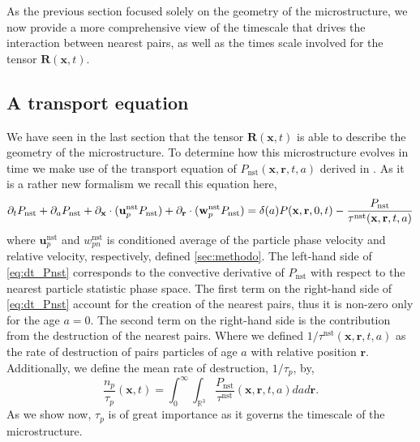 As the previous section focused solely on the geometry of the microstructure, we now provide a more comprehensive view of the timescale that drives the interaction between nearest pairs, as well as the times scale involved for the tensor $\textbf{R}(\textbf{x},t)$.

\subsection{A transport equation}
We have seen in the last section that the tensor $\textbf{R}(\textbf{x},t)$ is able to describe the geometry of the microstructure. 
To determine how this microstructure evolves in time we make use of the transport equation of $P_\text{nst}(\textbf{x},\textbf{r},t,a)$ derived in \citet{zhang2023evolution}.
As it is a rather new formalism we recall this equation here, 
\begin{equation}
    \partial_t P_\text{nst}
    + \partial_a P_\text{nst}
    + \partial_\textbf{x} \cdot  (\textbf{u}^\text{nst}_p P_\text{nst})
    + \partial_\textbf{r} \cdot  (\textbf{w}^\text{nst}_p P_\text{nst})
    = \delta(a)P(\textbf{x},\textbf{r},0,t)
    - \frac{P_\text{nst}}{\tau^\text{nst}(\textbf{x},\textbf{r},t,a)}
    \label{eq:dt_Pnst}
\end{equation}
where $\textbf{u}^\text{nst}_p$ and $w_{pn}^\text{nst}$ is conditioned average of the particle phase velocity and relative velocity, respectively, defined \ref{sec:methodo}. 
The left-hand side of \ref{eq:dt_Pnst} corresponds to the convective derivative of $P_\text{nst}$ with respect to the nearest particle statistic phase space. 
The first term on the right-hand side of \ref{eq:dt_Pnst} account for the creation of the nearest pairs, thus it is non-zero only for the age $a = 0$. 
The second term on the right-hand side is the contribution from the destruction of the nearest pairs.
Where we defined $1/\tau^\text{nst}(\textbf{x},\textbf{r},t,a)$ as the rate of destruction of pairs particles of age $a$ with relative position $\textbf{r}$.
Additionally, we define the mean rate of destruction, $1/\tau_p$, by, 
\begin{equation*}
    \frac{n_p}{\tau_p}(\textbf{x},t) = 
    \int_{0}^\infty
    \int_{\mathbb{R}^3}
    \frac{P_\text{nst} }{\tau^\text{nst}}(\textbf{x},\textbf{r},t,a)
    da d\textbf{r}. 
\end{equation*}
As we show now, $\tau_p$ is of great importance as it governs the timescale of the microstructure.

